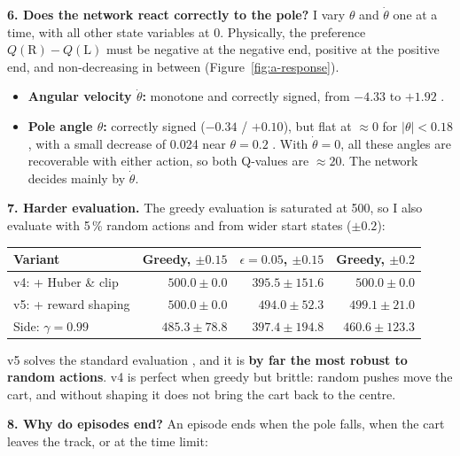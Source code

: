 \textbf{6. Does the network react correctly to the pole?} I vary $\theta$ and $\dot\theta$ one at a time, with all other state variables at 0. Physically, the preference $Q(\text{R}) - Q(\text{L})$ must be negative at the negative end, positive at the positive end, and non-decreasing in between (Figure~\ref{fig:a-response}).
\begin{itemize}
  \item \textbf{Angular velocity $\dot\theta$:} monotone and correctly signed, from $-4.33$ to $+1.92$ \pass.
  \item \textbf{Pole angle $\theta$:} correctly signed ($-0.34$ / $+0.10$), but flat at $\approx 0$ for $|\theta| < 0.18$, with a small decrease of 0.024 near $\theta = 0.2$ \fail. With $\dot\theta = 0$, all these angles are recoverable with either action, so both Q-values are $\approx 20$. The network decides mainly by $\dot\theta$.
\end{itemize}


\textbf{7. Harder evaluation.} The greedy evaluation is saturated at 500, so I also evaluate with 5\,\% random actions and from wider start states ($\pm 0.2$):

\begin{center}
\small
\begin{tabular}{@{}lrrr@{}}
  \toprule
  \textbf{Variant} & \textbf{Greedy, $\pm 0.15$} & \textbf{$\epsilon = 0.05$, $\pm 0.15$} & \textbf{Greedy, $\pm 0.2$} \\
  \midrule
  v4: + Huber \& clip & $500.0 \pm 0.0$ & $395.5 \pm 151.6$ & $500.0 \pm 0.0$ \\
  v5: + reward shaping & $500.0 \pm 0.0$ & $\mathbf{494.0 \pm 52.3}$ & $499.1 \pm 21.0$ \\
  Side: $\gamma = 0.99$ & $485.3 \pm 78.8$ & $397.4 \pm 194.8$ & $460.6 \pm 123.3$ \\
  \bottomrule
\end{tabular}
\end{center}

v5 solves the standard evaluation \pass, and it is \textbf{by far the most robust to random actions}. v4 is perfect when greedy but brittle: random pushes move the cart, and without shaping it does not bring the cart back to the centre.

\textbf{8. Why do episodes end?} An episode ends when the pole falls, when the cart leaves the track, or at the time limit:

